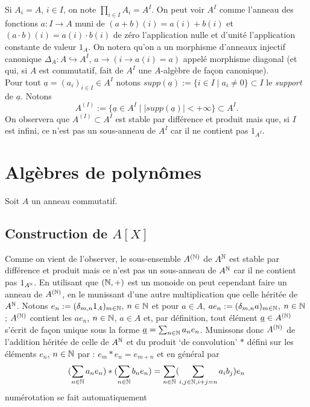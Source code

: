 Si $A_i=A$, $i\in I$, on note $\prod_{i\in I}A_i=A^I$. On peut  voir $A^I$
comme l'anneau des fonctions $a:I\rightarrow A$ muni de $(a+b)(i)=a(i)+b(i)$
et $(a\cdot b)(i)=a(i)\cdot b(i)$  de zéro l'application nulle et d'unité
l'application constante de valeur $1_A$. On notera qu'on a un morphisme
d'anneaux injectif canonique $\Delta_A:A\hookrightarrow A^I$, $a\rightarrow
(i\rightarrow a(i)=a)$ appelé morphisme diagonal (et qui, si $A$ est
commutatif,   fait de $A^I$  une $A$-algèbre de fa\c{c}on canonique).\\

Pour tout $\underline{a}=(a_i)_{i\in I}\in A^I$ notons
$supp(\underline{a}):=\lbrace i\in I\; |\; a_i\not= 0\rbrace\subset I$ le
\textit{support} de $\underline{a}$. Notons $$A^{(I)}:=\lbrace \underline{a}\in
A^I\; |\; |supp(\underline{a})|<+\infty\rbrace \subset A^I.$$ On observera que
$A^{(I)}\subset A^I$ est stable par différence et produit mais que, si $I$ est
infini, ce n'est pas un sous-anneau de $A^I$ car il ne contient pas $1_{A^I}$. 


\section{Algèbres de polynômes}\label{Poly}

Soit $A$ un anneau commutatif.

\subsection{Construction de $A[X]$}

Comme on vient de l'observer, le sous-ensemble $A^{(\mathbb{N})}$ de $ A^{\mathbb{N}}$ est stable
par différence et produit mais ce n'est pas un sous-anneau de $A^{\mathbb{N}}$ car il ne
contient pas $1_{A^{\mathbb{N}}}$. En utilisant que $(\mathbb{N},+)$ est un monoide on peut
cependant faire un anneau de $A^{(\mathbb{N})}$, en le munissant d'une autre
multiplication que celle héritée de $A^{\mathbb{N}}$. Notons
$e_n:=(\delta_{m,n}1_{A})_{m\in \mathbb{N}}$, $n\in \mathbb{N}$ et pour $a\in A$,
$ae_n:=(\delta_{m,n}a)_{m\in \mathbb{N}}$, $n\in \mathbb{N}$ ; $A^{(\mathbb{N})}$ contient les $ae_n$,
$n\in \mathbb{N}$, $a\in A$ et, par définition,  tout élément $\underline{a}\in
A^{(\mathbb{N})}$ s'écrit de façon unique sous la forme $\underline{a}=\sum_{n\in
\mathbb{N}}a_ne_n$. Munissons donc $A^{(\mathbb{N})}$ de l'addition héritée de celle de $A^{\mathbb{N}}$
et du produit `de convolution' $*$ défini sur les éléments $e_n$, $n\in \mathbb{N}$ par
: $e_m*e_n=e_{m+n} $ et en général par \begin{equation}(\sum_{n\in\mathbb{N}}a_ne_n)
*(\sum_{n\in \mathbb{N}}b_ne_n)=\sum_{n\in \mathbb{N}}(\sum_{i,j\in \mathbb{N},
i+j=n}a_ib_j)e_n\end{equation} %
numérotation se fait automatiquement

